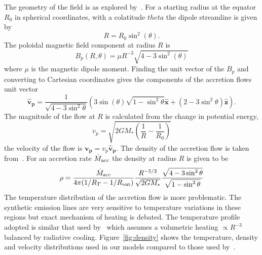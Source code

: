 \documentclass[fleqn,usenatbib]{mnras}
\begin{document}
The geometry of the field is as explored by~\citet{1991ApJ...370L..39K,1977ApJ...217..578G}. For a starting radius at the equator $R_{0}$ in spherical coordinates, with a colatitude $theta$ the dipole streamline is given by
\begin{equation}
    R = R_{0}\sin^{2}(\theta).
\end{equation}
The poloidal magnetic field component at radius $R$ is
\begin{equation}
    B_{p}(R,\theta) = \mu R^{-3}\sqrt{4-3\sin^{2}(\theta )}
\end{equation}
where $\mu$ is the magnetic dipole moment. Finding the unit vector of the $B_p$ and converting to Cartesian coordinates gives the components of the accretion flows unit vector
\begin{equation}
     \mathbf{\hat{v}_p} = \frac{1}{\sqrt{4-3\sin^2\theta}}\left(3\sin(\theta)\sqrt{1-\sin^2\theta}\mathbf{\hat{x}}+(2-3\sin^2\theta)\mathbf{\hat{z}}\right).
\end{equation}
The magnitude of the flow at $R$ is calculated from the change in potential energy,
\begin{equation}
    v_p = \sqrt{2GM_{\ast}(\frac{1}{R} - \frac{1}{R_0})}
\end{equation}
the velocity of the flow is $\mathbf{v_p}=v_p\mathbf{\hat{v}_p}$.
The density of the accretion flow is taken from~\citep{Hartmann:1994tl}. For an accretion rate $\dot{M}_{\rm acc}$ the density at radius $R$ is given to be
\begin{equation}
    \rho = \frac{\dot{M}_{\rm acc}}{4\pi(1/R_T - 1/R_{\rm out})}\frac{R^{-5/2}}{\sqrt{2GM_{\ast}}}\frac{\sqrt{4-3\sin^2\theta}}{\sqrt{1-\sin^2\theta}}
\end{equation}
The temperature distribution of the accretion flow is more problematic. The synthetic emission lines are very sensitive to temperature variations in these regions but exact mechanism of heating is debated. The temperature profile adopted is similar that used by~\citet{Hartmann:1994tl,1998ApJ...492..743M} which assumes a volumetric heating $\propto R^{-3}$ balanced by radiative cooling. Figure~\ref{fig:density} shows the temperature, density and velocity distributions used in our models compared to those used by~\citet{1998ApJ...492..743M}.
\end{document}
